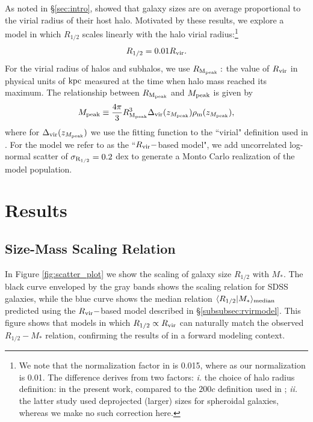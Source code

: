 \documentclass[usenatbib,usegraphicx,letterpaper]{mn2e}
\newcommand{\beq}{\begin{equation}}
\newcommand{\eeq}{\end{equation}}
\newcommand{\rhalf}{R_{1/2}}
\newcommand{\sigmarhalf}{\sigma_{\rm R_{1/2}}}
\newcommand{\mstar}{M_{\ast}}
\newcommand{\mpeak}{M_{\rm peak}}
\newcommand{\zpeak}{z_{M_{\rm peak}}}
\newcommand{\rvir}{R_{\rm vir}}
\newcommand{\rmpeak}{R_{\rm M_{peak}}}
\newcommand{\median}[2]{\langle{#1}\vert{#2}\rangle_{\rm median}}
\newcommand{\kpc}{{\rm kpc}}
\begin{document}
As noted in \S\ref{sec:intro}, \citet{kravtsov13} showed that galaxy sizes are on average proportional to the virial radius of their host halo. Motivated by these results, we  explore a model in which $\rhalf$ scales linearly with the halo virial radius:\footnote{We note that the normalization factor in \citet{kravtsov13} is 0.015, where as our normalization is 0.01. The difference derives from two factors: {\em i.} the choice of halo radius definition: \citet{bryan_norman98} in the present work, compared to the $200c$ definition used in \citet{kravtsov13}; {\em ii.} the latter study used deprojected (larger) sizes for spheroidal galaxies, whereas we make no such correction here.}
\beq
\label{eq:fiducial_model}
\rhalf = 0.01\rvir.
\eeq
For the virial radius of halos and subhalos, we use $\rmpeak:$ the value of $\rvir$ in physical units of $\kpc$ measured at the time when halo mass reached its maximum.  The relationship between $\rmpeak$ and $\mpeak$ is given by
\beq
\mpeak\equiv\frac{4\pi}{3}\rmpeak^{3}\Delta_{\rm vir}(\zpeak)\rho_{\rm m}(\zpeak),
\eeq
where for $\Delta_{\rm vir}(\zpeak)$ we use the fitting function to the ``virial" definition used in \citet{bryan_norman98}. For the model we refer to as the ``$\rvir-$based model", we add uncorrelated log-normal scatter of $\sigmarhalf=0.2$ dex to generate a Monto Carlo realization of the model population.

\section{Results}
\label{sec:results}

\subsection{Size-Mass Scaling Relation}
\label{subsec:one_point_function}

In Figure \ref{fig:scatter_plot} we show the scaling of galaxy size $\rhalf$ with $\mstar.$ The black curve enveloped by the gray bands shows the scaling relation for SDSS galaxies, while the blue curve shows the median relation  $\median{\rhalf}{\mstar}$ predicted using the $\rvir-$based model described in \S\ref{subsubsec:rvirmodel}. This figure shows that models in which $\rhalf\propto\rvir$ can naturally match the observed $\rhalf-\mstar$ relation, confirming the results of \citet{kravtsov13} in a forward modeling context.
\end{document}
